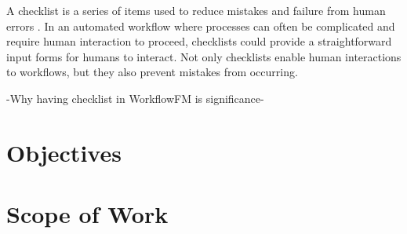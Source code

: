 


A checklist is a series of items used to reduce mistakes and failure from human errors \cite{whatischecklist}.
In an automated workflow where processes can often be complicated and require human interaction to proceed, checklists could provide a straightforward input forms for humans to interact. Not only checklists enable human interactions to workflows, but they also prevent mistakes from occurring.

-Why having checklist in WorkflowFM is significance-





\section{Objectives}


\section{Scope of Work}
